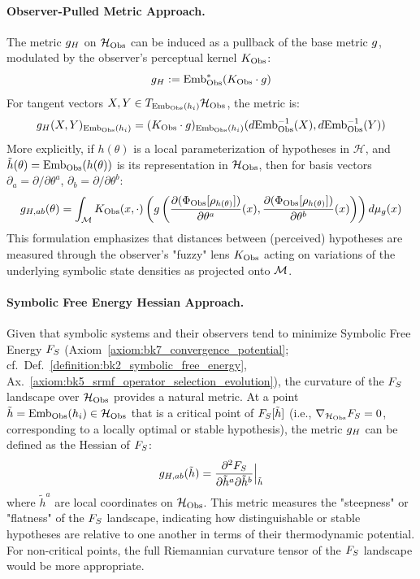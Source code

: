 \paragraph{Observer-Pulled Metric Approach.}
The metric \(g_H\) on \(\mathcal{H}_{\mathrm{Obs}}\) can be induced as a pullback of the base metric \(g\), modulated by the observer's perceptual kernel \(K_{\mathrm{Obs}}\):
\begin{equation}
g_H := \text{Emb}_{\mathrm{Obs}}^*(K_{\mathrm{Obs}} \cdot g)
\end{equation}
For tangent vectors \(X, Y \in T_{\text{Emb}_{\mathrm{Obs}}(h_i)}\mathcal{H}_{\mathrm{Obs}}\), the metric is:
\begin{equation}
g_H(X, Y)_{\text{Emb}_{\mathrm{Obs}}(h_i)} = (K_{\mathrm{Obs}} \cdot g)_{\text{Emb}_{\mathrm{Obs}}(h_i)}(d\text{Emb}_{\mathrm{Obs}}^{-1}(X), d\text{Emb}_{\mathrm{Obs}}^{-1}(Y))
\label{eq:bk8_observer_pulled_metric}
\end{equation}
More explicitly, if \(h(\theta)\) is a local parameterization of hypotheses in \(\mathcal{H}\), and \(\tilde{h}(\theta) = \text{Emb}_{\mathrm{Obs}}(h(\theta))\) is its representation in \(\mathcal{H}_{\mathrm{Obs}}\), then for basis vectors \(\partial_a = \partial/\partial\theta^a\), \(\partial_b = \partial/\partial\theta^b\):
\begin{equation}
g_{H,ab}(\theta) = \int_{\mathcal{M}} K_{\mathrm{Obs}}(x, \cdot) \left( g\left( \frac{\partial (\Phi_{\mathrm{Obs}}[\rho_{h(\theta)}])}{\partial \theta^a}(x), \frac{\partial (\Phi_{\mathrm{Obs}}[\rho_{h(\theta)}])}{\partial \theta^b}(x) \right) \right) d\mu_{g}(x)
\end{equation}
This formulation emphasizes that distances between (perceived) hypotheses are measured through the observer's "fuzzy" lens \(K_{\mathrm{Obs}}\) acting on variations of the underlying symbolic state densities as projected onto \(\mathcal{M}\).
\paragraph{Symbolic Free Energy Hessian Approach.}
Given that symbolic systems and their observers tend to minimize Symbolic Free Energy \(F_S\) (Axiom~\ref{axiom:bk7_convergence_potential}; cf.~Def.~\ref{definition:bk2_symbolic_free_energy}, Ax.~\ref{axiom:bk5_srmf_operator_selection_evolution}), the curvature of the \(F_S\) landscape over \(\mathcal{H}_{\mathrm{Obs}}\) provides a natural metric. At a point \(\tilde{h} = \text{Emb}_{\mathrm{Obs}}(h_i) \in \mathcal{H}_{\mathrm{Obs}}\) that is a critical point of \(F_S[\tilde{h}]\) (i.e., \(\nabla_{\mathcal{H}_{\mathrm{Obs}}}F_S = 0\), corresponding to a locally optimal or stable hypothesis), the metric \(g_H\) can be defined as the Hessian of \(F_S\):
\begin{equation}
g_{H,ab}(\tilde{h}) = \frac{\partial^2 F_S}{\partial \tilde{h}^a \partial \tilde{h}^b} \Big|_{\tilde{h}}
\label{eq:bk8_hessian_metric}
\end{equation}
where \(\tilde{h}^a\) are local coordinates on \(\mathcal{H}_{\mathrm{Obs}}\). This metric measures the "steepness" or "flatness" of the \(F_S\) landscape, indicating how distinguishable or stable hypotheses are relative to one another in terms of their thermodynamic potential. For non-critical points, the full Riemannian curvature tensor of the \(F_S\) landscape would be more appropriate.
